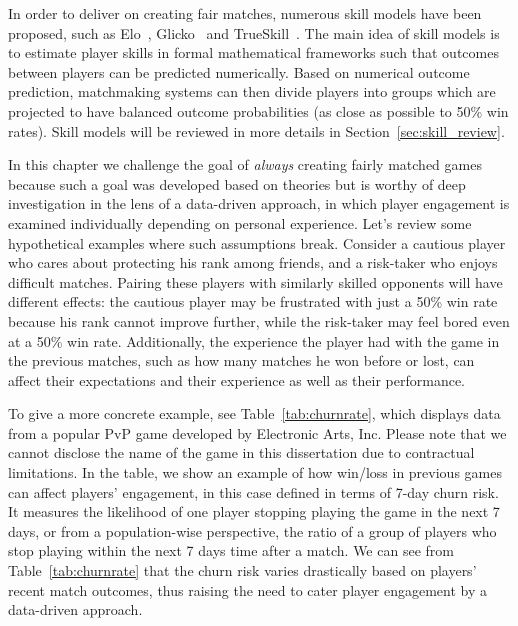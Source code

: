 In order to deliver on creating fair matches, numerous skill models have been proposed, such as Elo~\citep{elo1978rating}, Glicko~\citep{glickman1999parameter} and TrueSkill~\citep{herbrich:trueskill}. The main idea of skill models is to estimate player skills in formal mathematical frameworks such that outcomes between players can be predicted numerically. Based on numerical outcome prediction, matchmaking systems can then divide players into groups which are projected to have balanced outcome probabilities (as close as possible to 50\% win rates). Skill models will be reviewed in more details in Section~\ref{sec:skill_review}.

In this chapter we challenge the goal of \textit{always} creating fairly matched games because such a goal was developed based on theories  but is worthy of deep investigation in the lens of a data-driven approach, in which player engagement is examined individually depending on personal experience. Let's review some hypothetical examples where such assumptions break. Consider a cautious player who cares about protecting his rank among friends, and a risk-taker who enjoys difficult matches. Pairing these players with similarly skilled opponents will have different effects: the cautious player may be frustrated with just a 50\% win rate because his rank cannot improve further, while the risk-taker may feel bored even at a 50\% win rate. Additionally, the experience the player had with the game in the previous matches, such as how many matches he won before or lost, can affect their expectations and their experience as well as their performance. 

To give a more concrete example, see Table~\ref{tab:churnrate}, which displays data from a popular PvP game developed by Electronic Arts, Inc. Please note that we cannot disclose the name of the game in this dissertation due to contractual limitations. In the table, we show an example of how win/loss in previous games can affect players' engagement, in this case defined in terms of 7-day churn risk. It measures the likelihood of one player stopping playing the game in the next 7 days, or from a population-wise perspective, the ratio of a group of players who stop playing within the next 7 days time after a match. We can see from Table~\ref{tab:churnrate} that the churn risk varies drastically based on players' recent match outcomes, thus raising the need to cater player engagement by a data-driven approach. 

